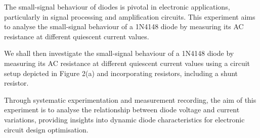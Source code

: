 {The small-signal behaviour of diodes is pivotal in electronic applications, particularly in signal processing and amplification circuits. This experiment aims to analyse the small-signal behaviour of a 1N4148 diode by measuring its AC resistance at different quiescent current values.}

{We shall then investigate the small-signal behaviour of a 1N4148 diode by measuring its AC resistance at different quiescent current values using a circuit setup depicted in Figure 2(a) and incorporating resistors, including a shunt resistor.}

{Through systematic experimentation and measurement recording, the aim of this experiment is to analyse the relationship between diode voltage and current variations, providing insights into dynamic diode characteristics for electronic circuit design optimisation.}

{}

